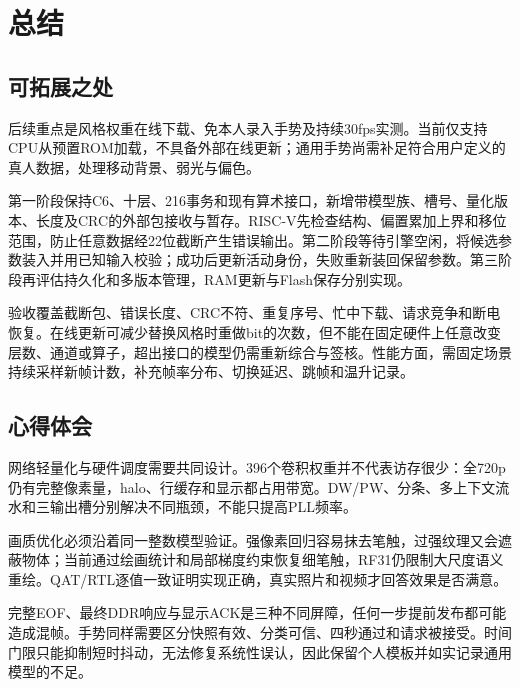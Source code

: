 \clearpage
\section{总结}
\subsection{可拓展之处}
后续重点是风格权重在线下载、免本人录入手势及持续30fps实测。当前仅支持CPU从预置ROM加载，不具备外部在线更新；通用手势尚需补足符合用户定义的真人数据，处理移动背景、弱光与偏色。

第一阶段保持C6、十层、216事务和现有算术接口，新增带模型族、槽号、量化版本、长度及CRC的外部包接收与暂存。RISC-V先检查结构、偏置累加上界和移位范围，防止任意数据经22位截断产生错误输出。第二阶段等待引擎空闲，将候选参数装入并用已知输入校验；成功后更新活动身份，失败重新装回保留参数。第三阶段再评估持久化和多版本管理，RAM更新与Flash保存分别实现。

验收覆盖截断包、错误长度、CRC不符、重复序号、忙中下载、请求竞争和断电恢复。在线更新可减少替换风格时重做bit的次数，但不能在固定硬件上任意改变层数、通道或算子，超出接口的模型仍需重新综合与签核。性能方面，需固定场景持续采样新帧计数，补充帧率分布、切换延迟、跳帧和温升记录。

\subsection{心得体会}
网络轻量化与硬件调度需要共同设计。396个卷积权重并不代表访存很少：全720p仍有完整像素量，halo、行缓存和显示都占用带宽。DW/PW、分条、多上下文流水和三输出槽分别解决不同瓶颈，不能只提高PLL频率。

画质优化必须沿着同一整数模型验证。强像素回归容易抹去笔触，过强纹理又会遮蔽物体；当前通过绘画统计和局部梯度约束恢复细笔触，RF31仍限制大尺度语义重绘。QAT/RTL逐值一致证明实现正确，真实照片和视频才回答效果是否满意。

完整EOF、最终DDR响应与显示ACK是三种不同屏障，任何一步提前发布都可能造成混帧。手势同样需要区分快照有效、分类可信、四秒通过和请求被接受。时间门限只能抑制短时抖动，无法修复系统性误认，因此保留个人模板并如实记录通用模型的不足。
